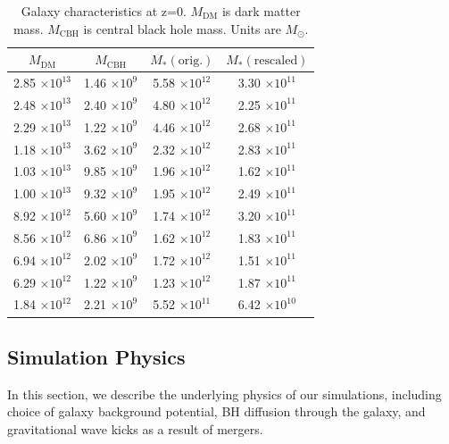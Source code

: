 \documentclass[fleqn,usenatbib,useAMS]{mnras}
\begin{document}
\begin{table}
\begin{center}
\caption{Galaxy characteristics at z=0. $M_\mathrm{DM}$ is dark matter mass.  $M_\mathrm{CBH}$ is central black hole mass.  Units are $M_{\odot}$.}
\begin{tabular} {|c | c | c| c|}
\hline
$M_\mathrm{DM}$ & $M_\mathrm{CBH}$ & $M_{*} \mathrm{(orig.)}$ & $M_{*} \mathrm{(rescaled)}$ \\
\hline
 2.85 $\times 10^{13}$ 	&	 1.46 $\times 10^9$	&	5.58 $\times 10^{12}$ 	&	3.30 $\times 10^{11}$  \\
 2.48 $\times 10^{13}$ 	&	 2.40 $\times 10^9$	&	4.80 $\times 10^{12}$ 	&	2.25 $\times 10^{11}$  \\
 2.29 $\times 10^{13}$ 	&	 1.22 $\times 10^9$	&	4.46 $\times 10^{12}$ 	&	2.68 $\times 10^{11}$  \\
 1.18 $\times 10^{13}$ 	&	 3.62 $\times 10^9$	&	2.32 $\times 10^{12}$ 	&	2.83 $\times 10^{11}$  \\
 1.03 $\times 10^{13}$ 	&	 9.85 $\times 10^9$	&	1.96 $\times 10^{12}$ 	&	1.62 $\times 10^{11}$  \\
 1.00 $\times 10^{13}$ 	&	 9.32 $\times 10^9$	&	1.95 $\times 10^{12}$ 	&	2.49 $\times 10^{11}$  \\
 8.92 $\times 10^{12}$ 	&	 5.60 $\times 10^9$	&	1.74 $\times 10^{12}$ 	&	3.20 $\times 10^{11}$  \\
 8.56 $\times 10^{12}$ 	&	 6.86 $\times 10^9$	&	1.62 $\times 10^{12}$ 	&	1.83 $\times 10^{11}$  \\
 6.94 $\times 10^{12}$ 	&	 2.02 $\times 10^9$	&	1.72 $\times 10^{12}$ 	&	1.51 $\times 10^{11}$  \\
 6.29 $\times 10^{12}$ 	&	 1.22 $\times 10^9$	&	1.23 $\times 10^{12}$ 	&	1.87 $\times 10^{11}$  \\
 1.84 $\times 10^{12}$ 	&	 2.21 $\times 10^9$	&	5.52 $\times 10^{11}$ 	&	6.42 $\times 10^{10}$  \\
\hline
\end{tabular}
\end{center}
\label{table:gal_char}
\end{table}

\subsection{Simulation Physics}
In this section, we describe the underlying physics of our simulations, including choice of galaxy background potential, BH diffusion through the galaxy, and gravitational wave kicks as a result of mergers.
\end{document}
